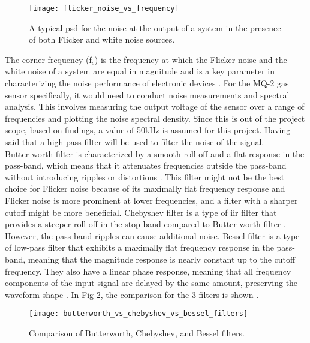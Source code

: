 \begin{figure}[ht]
    \centering\texttt{[image: flicker\_noise\_vs\_frequency]}
    \caption{A typical \acrshort{psd} for the noise at the output of a system in the presence of both Flicker and white noise sources.}
    \label{fig:flicker_noise_vs_frequency}
\end{figure}

The corner frequency (f$_{c}$) is the frequency at which the Flicker noise and the white noise of a system are equal in magnitude and is a key parameter in characterizing the noise performance of electronic devices \cite{smulko_2024}. For the MQ-2 gas sensor specifically, it would need to conduct noise measurements and spectral analysis. This involves measuring the output voltage of the sensor over a range of frequencies and plotting the noise spectral density. Since this is out of the project scope, based on \cite{smulko_2024} findings, a value of 50kHz is assumed for this project. Having said that a high-pass filter will be used to filter the noise of the signal. \\

Butter-worth filter is characterized by a smooth roll-off and a flat response in the pass-band, which means that it attenuates frequencies outside the pass-band without introducing ripples or distortions \cite{ruofei_2021}. This filter might not be the best choice for Flicker noise because of its maximally flat frequency response and Flicker noise is more prominent at lower frequencies, and a filter with a sharper cutoff might be more beneficial. Chebyshev filter is a type of \acrfull{iir} filter that provides a steeper roll-off in the stop-band compared to Butter-worth filter \cite{podder_2014}. However, the pass-band ripples can cause additional noise. Bessel filter is a type of low-pass filter that exhibits a maximally flat frequency response in the pass-band, meaning that the magnitude response is nearly constant up to the cutoff frequency. They also have a linear phase response, meaning that all frequency components of the input signal are delayed by the same amount, preserving the waveform shape \cite{ashu_2021}. In Fig \ref{fig:butterworth_vs_chebyshev_vs_bessel_filters}, the comparison for the 3 filters is shown \cite{kikkert_2008}. \\

\begin{figure}[ht]
    \centering\texttt{[image: butterworth\_vs\_chebyshev\_vs\_bessel\_filters]}
    \caption{Comparison of Butterworth, Chebyshev, and Bessel filters.}
    \label{fig:butterworth_vs_chebyshev_vs_bessel_filters}
\end{figure}

